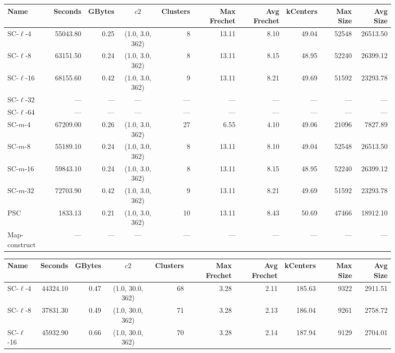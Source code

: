 \begin{figure} \begin{center}
    \begin{minipage}{\textwidth}
{
\begin{tabular}{@{}lrrcrrrrrr@{}}
    \toprule
    Name & Seconds & GBytes & $c2$ & Clusters & Max Frechet & Avg Frechet & kCenters & Max Size & Avg Size\\
    \midrule
    SC-$\ell$-4 & 55043.80 & 0.25 & (1.0, 3.0, 362) & 8 & 13.11 & 8.10 & 49.04 & 52548 & 26513.50\\
    SC-$\ell$-8 & 63151.50 & 0.24 & (1.0, 3.0, 362) & 8 & 13.11 & 8.15 & 48.95 & 52240 & 26399.12\\
    SC-$\ell$-16 & 68155.60 & 0.42 & (1.0, 3.0, 362) & 9 & 13.11 & 8.21 & 49.69 & 51592 & 23293.78\\
    SC-$\ell$-32 & --- & --- & --- & --- & --- & --- & --- & --- & ---\\
    SC-$\ell$-64 & --- & --- & --- & --- & --- & --- & --- & --- & ---\\
    SC-$m$-4 & 67209.00 & 0.26 & (1.0, 3.0, 362) & 27 & 6.55 & 4.10 & 49.06 & 21096 & 7827.89\\
    SC-$m$-8 & 55189.10 & 0.24 & (1.0, 3.0, 362) & 8 & 13.11 & 8.10 & 49.04 & 52548 & 26513.50\\
    SC-$m$-16 & 59843.10 & 0.24 & (1.0, 3.0, 362) & 8 & 13.11 & 8.15 & 48.95 & 52240 & 26399.12\\
    SC-$m$-32 & 72703.90 & 0.42 & (1.0, 3.0, 362) & 9 & 13.11 & 8.21 & 49.69 & 51592 & 23293.78\\
    PSC & 1833.13 & 0.21 & (1.0, 3.0, 362) & 10 & 13.11 & 8.43 & 50.69 & 47466 & 18912.10\\
    Map-construct & --- & --- & --- & --- & --- & --- & --- & --- & ---\\
    \bottomrule
\end{tabular}
}
{
\begin{tabular}{@{}lrrcrrrrrr@{}}
    \toprule
    Name & Seconds & GBytes & $c2$ & Clusters & Max Frechet & Avg Frechet & kCenters & Max Size & Avg Size\\
    \midrule
    SC-$\ell$-4 & 44324.10 & 0.47 & (1.0, 30.0, 362) & 68 & 3.28 & 2.11 & 185.63 & 9322 & 2911.51\\
    SC-$\ell$-8 & 37831.30 & 0.49 & (1.0, 30.0, 362) & 71 & 3.28 & 2.13 & 186.04 & 9261 & 2758.72\\
    SC-$\ell$-16 & 45932.90 & 0.66 & (1.0, 30.0, 362) & 70 & 3.28 & 2.14 & 187.94 & 9129 & 2704.01\\

\end{tabular}}
\end{minipage}
\end{center}
\end{figure}
